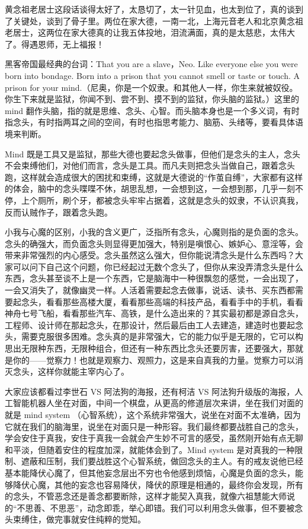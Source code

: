 黄念祖老居士这段话谈得太好了，太恳切了，太一针见血，也太到位了，真的谈到了关键处，谈到了骨子里。两位在家大德，一南一北，上海元音老人和北京黄念祖老居士，这两位在家大德真的让我五体投地，泪流满面，真的是太慈悲，太伟大了。得遇恩师，无上福报！

黑客帝国最经典的台词：That you are a slave，Neo. Like everyone else you were born into bondage. Born into a prison that you cannot smell or taste or touch. A prison for your mind.（尼奥，你是一个奴隶。和其他人一样，你生来就被奴役。你生下来就是监狱，你闻不到、尝不到、摸不到的监狱，你头脑的监狱。）这里的 mind 翻作头脑，指的就是思维、念头、心智。而头脑本身也是一个多义词，有时指念头，有时指两耳之间的空间，有时也指思考能力、脑筋、头绪等，要看具体语境来判断。

Mind 既是工具又是监狱，那些大德也要起念头做事，但他们是念头的主人，念头不会束缚他们，对他们而言，念头是工具。而凡夫则把念头当做自己，跟着念头跑，这样就会造成很大的困扰和束缚，这就是大德说的“作茧自缚”，大家都有这样的体会，脑中的念头喋喋不休，胡思乱想，一会想到这，一会想到那，几乎一刻不停，上个厕所，刷个牙，都被念头牢牢占据着，这就是念头的奴隶，不认识真我，反而认贼作子，跟着念头跑。

小我与心魔的区别，小我的含义更广，泛指所有念头，心魔则指的是负面的念头。念头的确强大，而负面念头则显得更加强大，特别是嗔恨心、嫉妒心、意淫等，会带来非常强烈的内心感受。念头虽然这么强大，但你能说清念头是什么东西吗？大家可以问下自己这个问题，你已经起过无数个念头了，但你从来没弄清念头是什么东西，念头甚至谈不上是一个东西，它是脑海中一种很飘忽的感觉，一会出现了，一会又消失了，就像幽灵一样。人活着需要起念去做事，说话、读书、买东西都需要起念头，看看那些高楼大厦，看看那些高端的科技产品，看看手中的手机，看看神舟七号飞船，看看那些汽车、高铁，是什么造出来的？其实最初都是源自念头，工程师、设计师在那起念头，在那设计，然后最后由工人去建造，建造时也要起念头，需要克服很多困难。念头真的是非常强大，它的能力似乎是无限的，它可以构思出无限种东西，无限种组合，但还有一种东西比念头还要厉害，还要强大，那就是你的——觉察力！也就是观察力、观照力，这是来自真我的力量。觉察力可以消灭念头，这样你就能主宰内心了。

大家应该都看过李世石 VS 阿法狗的海报，还有柯洁 VS 阿法狗升级版的海报，人工智能机器人坐在对面，中间一个棋盘，从更高的修道层次来讲，坐在我们对面的就是 mind system （心智系统），这个系统非常强大，说坐在对面不太准确，因为它就在我们的脑海里，说坐在对面只是一种形容。我们最终都要战胜自己的念头，学会安住于真我，安住于真我一会就会产生妙不可言的感受，虽然刚开始有点无聊和平淡，但随着安住的程度加深，就能体会到了。Mind system 是对真我的一种限制、遮蔽和压制，我们要战胜这个心智系统，做回念头的主人。有的戒友说他已经基本能降伏心魔了，但其他妄念层出不穷也令他感到烦恼，心魔是负面的念头，能够降伏心魔，其他的妄念也容易降伏，降伏的原理是相通的，最终你会发现，所有的念头，不管恶念还是善念都要断除，这样才能契入真我，就像六祖慧能大师说的“不思善、不思恶”，动念即乖，举心即错。我们可以利用念头做事，但不要被念头束缚住，做完事就安住纯粹的觉知。

